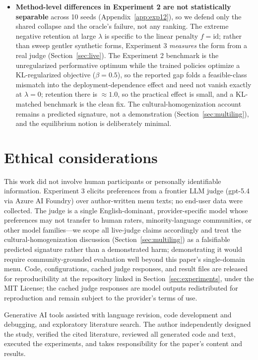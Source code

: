 ﻿\documentclass[11pt]{article}
\begin{document}
\begin{itemize}
\item \textbf{Method-level differences in Experiment 2 are not statistically separable} across 10 seeds (Appendix~\ref{app:exp12}), so we defend only the shared collapse and the oracle's failure, not any ranking. The extreme negative retention at large \(\lambda\) is specific to the linear penalty \(f = \mathrm{id}\); rather than sweep gentler synthetic forms, Experiment 3 \emph{measures} the form from a real judge (Section~\ref{sec:live}). The Experiment 2 benchmark is the unregularized performative optimum while the trained policies optimize a KL-regularized objective (\(\beta = 0.5\)), so the reported gap folds a feasible-class mismatch into the deployment-dependence effect and need not vanish exactly at \(\lambda = 0\); retention there is \(\approx 1.0\), so the practical effect is small, and a KL-matched benchmark is the clean fix. The cultural-homogenization account remains a predicted signature, not a demonstration (Section~\ref{sec:multiling}), and the equilibrium notion is deliberately minimal.
\end{itemize}


\section*{Ethical considerations}

This work did not involve human participants or personally identifiable information. Experiment 3 elicits preferences from a frontier LLM judge (gpt-5.4 via Azure AI Foundry) over author-written menu texts; no end-user data were collected. The judge is a single English-dominant, provider-specific model whose preferences may not transfer to human raters, minority-language communities, or other model families---we scope all live-judge claims accordingly and treat the cultural-homogenization discussion (Section~\ref{sec:multiling}) as a falsifiable predicted signature rather than a demonstrated harm; demonstrating it would require community-grounded evaluation well beyond this paper's single-domain menu. Code, configurations, cached judge responses, and result files are released for reproducibility at the repository linked in Section~\ref{sec:experiments}, under the MIT License; the cached judge responses are model outputs redistributed for reproduction and remain subject to the provider's terms of use.

Generative AI tools assisted with language revision, code development and debugging, and exploratory literature search. The author independently designed the study, verified the cited literature, reviewed all generated code and text, executed the experiments, and takes responsibility for the paper's content and results.
\end{document}
